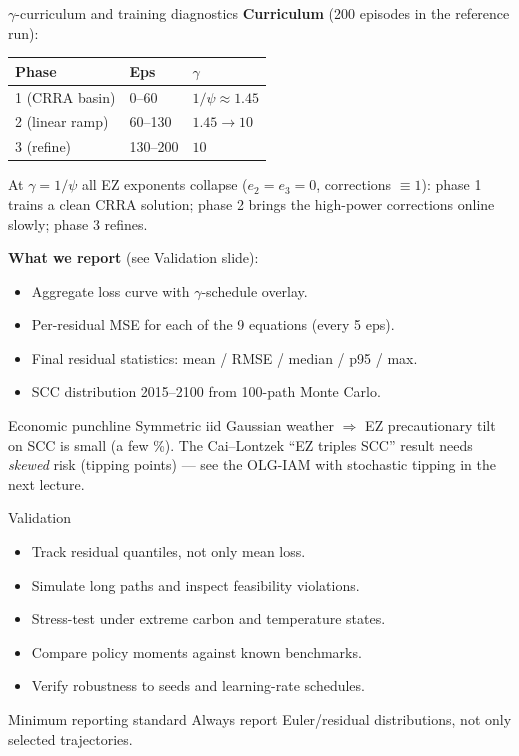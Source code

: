 \documentclass[aspectratio=169,11pt]{beamer}
\newcommand{\emphc}[1]{\textcolor{harvardcrimson}{#1}}
\begin{document}
\begin{frame}{$\gamma$-curriculum and training diagnostics}
\footnotesize
\textbf{Curriculum} (200 episodes in the reference run):
\begin{center}
\begin{tabular}{lll}
\toprule
\textbf{Phase} & \textbf{Eps} & $\gamma$ \\
\midrule
1 (CRRA basin)  & 0--60   & $1/\psi \approx 1.45$ \\
2 (linear ramp) & 60--130 & $1.45 \to 10$ \\
3 (refine)      & 130--200 & $10$ \\
\bottomrule
\end{tabular}
\end{center}
At $\gamma = 1/\psi$ all EZ exponents collapse ($e_2 = e_3 = 0$, corrections $\equiv 1$): phase 1 trains a clean CRRA solution; phase 2 brings the high-power corrections online slowly; phase 3 refines.

\textbf{What we report} (see Validation slide):
\begin{itemize}\setlength\itemsep{0pt}
    \item Aggregate loss curve with $\gamma$-schedule overlay.
    \item Per-residual MSE for each of the 9 equations (every 5 eps).
    \item Final residual statistics: mean / RMSE / median / p95 / max.
    \item SCC distribution 2015--2100 from 100-path Monte Carlo.
\end{itemize}

\begin{exampleblock}{Economic punchline}
Symmetric iid Gaussian weather $\Rightarrow$ EZ precautionary tilt on SCC is small (a few \%). The Cai--Lontzek ``EZ triples SCC'' result needs \emph{skewed} risk (tipping points) --- see the OLG-IAM with stochastic tipping in the next lecture.
\end{exampleblock}
\vspace{-0.1cm}
\end{frame}

\begin{frame}{Validation}
\begin{itemize}
    \item Track residual quantiles, not only mean loss.
    \item Simulate long paths and inspect feasibility violations.
    \item Stress-test under extreme carbon and temperature states.
    \item Compare policy moments against known benchmarks.
    \item Verify robustness to seeds and learning-rate schedules.
\end{itemize}

\vspace{0.25cm}
\begin{alertblock}{Minimum reporting standard}
Always report Euler/residual \emphc{distributions}, not only selected trajectories.
\end{alertblock}
\end{frame}
\end{document}
